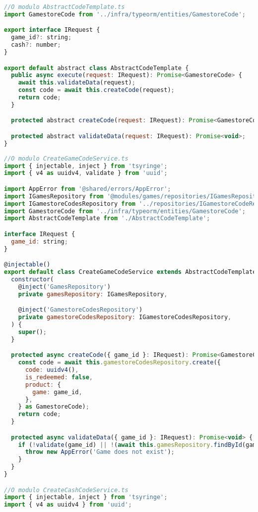 \begin{lstlisting}[language=JavaScript, caption={Implementação de acordo com o OCP},captionpos=b, label=alg:ocpexample]
//O modulo AbstractCodeTemplate.ts
import GamestoreCode from '../infra/typeorm/entities/GamestoreCode';

export interface IRequest {
  game_id?: string;
  cash?: number;
}

export default abstract class AbstractCodeTemplate {
  public async execute(request: IRequest): Promise<GamestoreCode> {
    await this.validateData(request);
    const code = await this.createCode(request);
    return code;
  }

  protected abstract createCode(request: IRequest): Promise<GamestoreCode>;

  protected abstract validateData(request: IRequest): Promise<void>;
}
  
//O modulo CreateGameCodeService.ts
import { injectable, inject } from 'tsyringe';
import { v4 as uuidv4, validate } from 'uuid';

import AppError from '@shared/errors/AppError';
import IGamesRepository from '@modules/games/repositories/IGamesRepository';
import IGamestoreCodesRepository from '../repositories/IGamestoreCodeRepository';
import GamestoreCode from '../infra/typeorm/entities/GamestoreCode';
import AbstractCodeTemplate from './AbstractCodeTemplate';

interface IRequest {
  game_id: string;
}

@injectable()
export default class CreateGameCodeService extends AbstractCodeTemplate {
  constructor(
    @inject('GamesRepository')
    private gamesRepository: IGamesRepository,

    @inject('GamestoreCodesRepository')
    private gamestoreCodesRepository: IGamestoreCodesRepository,
  ) {
    super();
  }

  protected async createCode({ game_id }: IRequest): Promise<GamestoreCode> {
    const code = await this.gamestoreCodesRepository.create({
      code: uuidv4(),
      is_redeemed: false,
      product: {
        game: game_id,
      },
    } as GamestoreCode);
    return code;
  }

  protected async validateData({ game_id }: IRequest): Promise<void> {
    if (!validate(game_id) || !(await this.gamesRepository.findById(game_id))) {
      throw new AppError('Game does not exist');
    }
  }
}

//O modulo CreateCashCodeService.ts
import { injectable, inject } from 'tsyringe';
import { v4 as uuidv4 } from 'uuid';


\end{lstlisting}
